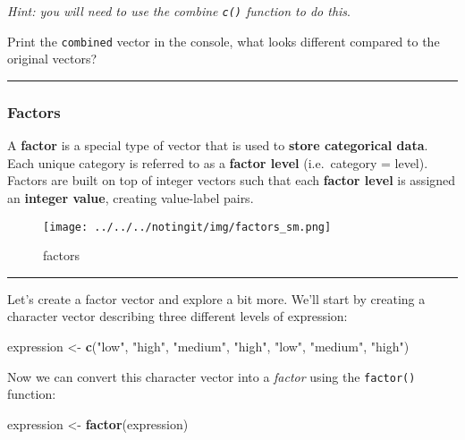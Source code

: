 \documentclass[
]{article}
\newenvironment{Shaded}{\begin{snugshade}}{\end{snugshade}}
\newcommand{\KeywordTok}[1]{\textcolor[rgb]{0.13,0.29,0.53}{\textbf{#1}}}
\newcommand{\NormalTok}[1]{#1}
\newcommand{\StringTok}[1]{\textcolor[rgb]{0.31,0.60,0.02}{#1}}
\begin{document}
\emph{Hint: you will need to use the combine \texttt{c()} function to do
this}.

Print the \texttt{combined} vector in the console, what looks different
compared to the original vectors?

\begin{center}\rule{0.5\linewidth}{0.5pt}\end{center}

\hypertarget{factors}{%
\subsubsection{Factors}\label{factors}}

A \textbf{factor} is a special type of vector that is used to
\textbf{store categorical data}. Each unique category is referred to as
a \textbf{factor level} (i.e.~category = level). Factors are built on
top of integer vectors such that each \textbf{factor level} is assigned
an \textbf{integer value}, creating value-label pairs.

\begin{figure}
\centering
\texttt{[image: ../../../notingit/img/factors\_sm.png]}
\caption{factors}
\end{figure}

\begin{center}\rule{0.5\linewidth}{0.5pt}\end{center}

Let's create a factor vector and explore a bit more. We'll start by
creating a character vector describing three different levels of
expression:

\begin{Shaded}
\begin{Highlighting}[]
\NormalTok{expression <-}\StringTok{ }\KeywordTok{c}\NormalTok{(}\StringTok{"low"}\NormalTok{, }\StringTok{"high"}\NormalTok{, }\StringTok{"medium"}\NormalTok{, }\StringTok{"high"}\NormalTok{, }\StringTok{"low"}\NormalTok{, }\StringTok{"medium"}\NormalTok{, }\StringTok{"high"}\NormalTok{)}
\end{Highlighting}
\end{Shaded}

Now we can convert this character vector into a \emph{factor} using the
\texttt{factor()} function:

\begin{Shaded}
\begin{Highlighting}[]
\NormalTok{expression <-}\StringTok{ }\KeywordTok{factor}\NormalTok{(expression)}
\end{Highlighting}
\end{Shaded}
\end{document}
